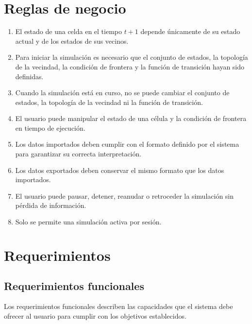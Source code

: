 \section{Reglas de negocio}

\begin{enumerate}[label*=RN\arabic*]
	
	\item El estado de una celda en el tiempo $t + 1$ depende únicamente de su estado actual y de los estados de sus vecinos.
	
	\item Para iniciar la simulación es necesario que el conjunto de estados, la topología de la vecindad, la condición de frontera y la función de transición hayan sido definidas. 
	
	\item Cuando la simulación está en curso, no se puede cambiar el conjunto de estados, la topología de la vecindad ni la función de transición.
	
	\item El usuario puede manipular el estado de una célula y la condición de frontera en tiempo de ejecución.
	
	\item Los datos importados deben cumplir con el formato definido por el sistema para garantizar su correcta interpretación.
	
	\item Los datos exportados deben conservar el mismo formato que los datos importados.
	
	\item El usuario puede pausar, detener, reanudar o retroceder la simulación sin pérdida de información. 
	
	\item Solo se permite una simulación activa por sesión.
	
\end{enumerate}

\section{Requerimientos}

\subsection{Requerimientos funcionales}

Los requerimientos funcionales describen las capacidades que el sistema debe ofrecer al usuario para cumplir con los objetivos establecidos.

